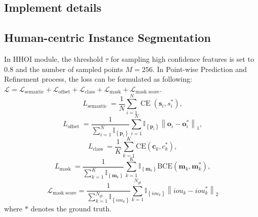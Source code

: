 \begin{appendix}






\section{Implement details}


\subsection{Human-centric Instance Segmentation}
In HHOI module, the threshold  $\tau$ for sampling high confidence features is set to 0.8 and the number of sampled points $M=256$.
In Point-wise Prediction and Refinement process,
the loss can be formulated as following: 
$\mathcal{L} = \mathcal{L}_{\text {semantic}}+\mathcal{L}_{\text {offset}}+\mathcal{L}_{\text {class}}+\mathcal{L}_{\text {mask}}+\mathcal{L}_{\text{mask score}}.$
$$
L_{\text {semantic }}=\frac{1}{N} \sum_{i=1}^N \operatorname{CE}\left(\boldsymbol{s}_i, s_i^*\right),$$
$$
L_{\text {offset }}=\frac{1}{\sum_{i=1}^N \mathbb{I}_{\left\{\boldsymbol{p}_i\right\}}} \sum_{i=1}^N \mathbb{I}_{\left\{\boldsymbol{p}_i\right\}}\left\|\boldsymbol{o}_i-\boldsymbol{o}_i^*\right\|_1,
$$
$$
L_{\text {class }}=\frac{1}{K} \sum_{k=1}^K \mathrm{CE}\left(\boldsymbol{c}_k, c_k^*\right), 
$$
$$
L_{\text {mask }}=\frac{1}{\sum_{k=1}^K \mathbb{I}_{\left\{\boldsymbol{m}_k\right\}}} \sum_{k=1}^K \mathbb{I}_{\left\{\boldsymbol{m}_k\right\}} \mathrm{BCE}\left(\boldsymbol{m}_k, \boldsymbol{m}_k^*\right), 
$$
$$
\mathcal{L}_{\text{mask score}}=\frac{1}{\sum_{k=1}^{N_{g t}} \mathbb{I}_{\left\{iou_k\right\}}} \sum_{k=1}^{N_{g t}} \mathbb{I}_{\left\{iou_k\right\}}\left\|iou_k-iou_k^*\right\|_2
$$
where $*$ denotes the ground truth.




\end{appendix}
